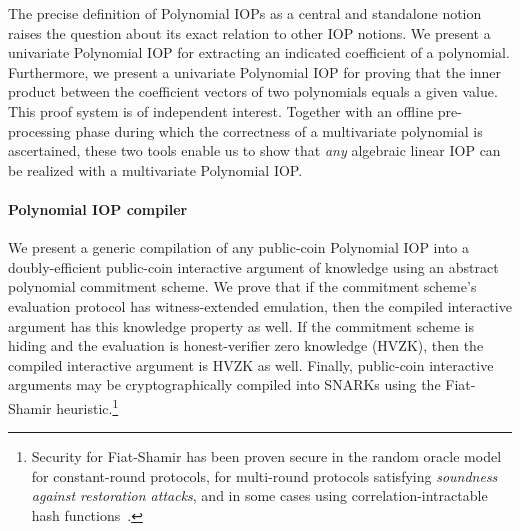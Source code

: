 The precise definition of Polynomial IOPs as a central and standalone notion raises the question about its exact relation to other IOP notions. We present a univariate Polynomial IOP for extracting an indicated coefficient of a polynomial. 
Furthermore, we present a univariate Polynomial IOP for proving that the inner product between the coefficient vectors of two polynomials equals a given value. This proof system is of independent interest. Together with an offline pre-processing phase during which the correctness of a multivariate polynomial is ascertained, these two tools enable us to show that \emph{any} algebraic linear IOP can be realized with a multivariate Polynomial IOP. 



\paragraph{Polynomial IOP compiler} 
We present a generic compilation of any public-coin Polynomial IOP into a doubly-efficient public-coin interactive argument of knowledge using an abstract polynomial commitment scheme. We prove that if the commitment scheme's evaluation protocol has witness-extended emulation, then the compiled interactive argument has this knowledge property as well. If the commitment scheme is hiding and the evaluation is honest-verifier zero knowledge (HVZK), then the compiled interactive argument is HVZK as well. Finally, public-coin interactive arguments may be cryptographically compiled into SNARKs using the Fiat-Shamir heuristic.\footnote{Security for Fiat-Shamir has been proven secure in the random oracle model for constant-round protocols, for multi-round protocols satisfying \emph{soundness against restoration attacks}, and in some cases using correlation-intractable hash functions~\cite{C:FiaSha86,TCC:BenChiSpo16,C:KalRotRot17,EC:CCRR18,STOC:CCHLRRW19}.}

